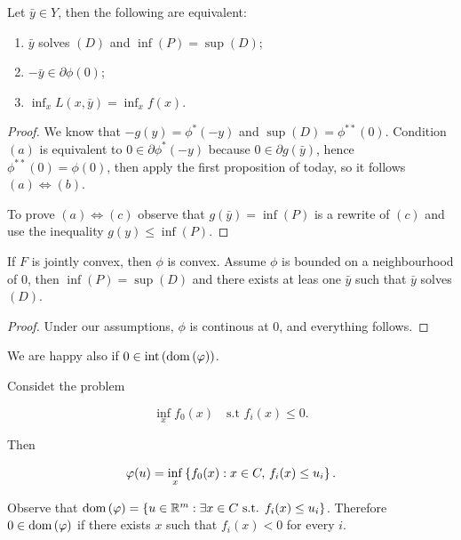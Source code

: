 \begin{theorem}
    
    Let $\bar{y} \in Y$, then the following are equivalent:

    \begin{enumerate}
        \item[$(a)$] $\bar{y}$ solves $(D)$ and $\inf(P) = \sup(D)$;
        \item[$(b)$] $-\bar{y} \in \partial \phi(0)$;
        \item[$(c)$] $\inf_x L(x,\bar{y}) = \inf_x f(x)$.
    \end{enumerate}

\end{theorem}


\begin{proof}
    
    We know that $-g(y) = \phi^*(-y)$ and $\sup(D) = \phi^{**}(0)$. Condition $(a)$ is equivalent to $0 \in \partial\phi^*(-y)$ because $0 \in \partial g(\bar{y})$, hence $\phi^{**}(0) = \phi(0)$, then apply the first proposition of today, so it follows $(a) \iff (b)$. 

    To prove $(a) \iff (c)$ observe that $g(\bar{y}) = \inf(P)$ is a rewrite of $(c)$ and use the inequality $g(y) \le \inf(P)$.

\end{proof}

\begin{theorem}
    
    If $F$ is jointly convex, then $\phi$ is convex. Assume $\phi$ is bounded on a neighbourhood of $0$, then $\inf(P) = \sup(D)$ and there exists at leas one $\bar{y}$ such that $\bar{y}$ solves $(D)$.

\end{theorem}

\begin{proof}
    Under our assumptions, $\phi$ is continous at $0$, and everything follows.
\end{proof}

\begin{remark}
    
    We are happy also if $0 \in \mathrm{int}\left(\mathrm{dom}\left(\varphi\right)\right)$.

\end{remark}

\begin{example}
    
    Considet the problem 

    \[ \inf_x f_0(x) \quad \text{s.t } f_i(x) \le 0. \]

    Then 

    \[ \varphi(u) = \inf_x \left\{ f_0(x) : x \in C,\, f_i(x) \le u_i \right\}. \]

    Observe that $\mathrm{dom}\left(\varphi\right) = \left\{ u \in \mathbb{R}^m : \exists x \in C \text{ s.t. } f_i(x) \le u_i \right\}$. Therefore $0 \in \mathrm{dom}\left(\varphi\right)$ if there exists $x$ such that $f_i(x) < 0$ for every $i$.

\end{example}

